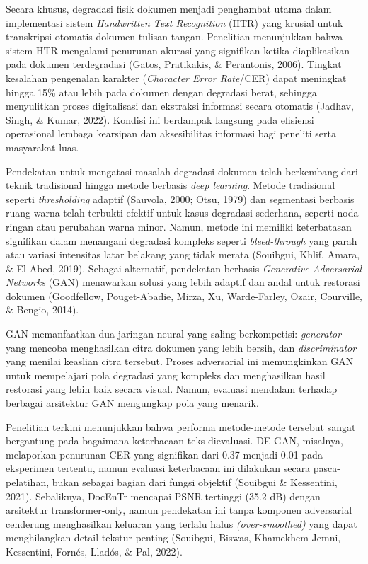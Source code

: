 \documentclass[12pt,a4paper]{article}
\begin{document}
\vspace{0.8em}
Secara khusus, degradasi fisik dokumen menjadi penghambat utama dalam implementasi sistem \textit{Handwritten Text Recognition} (HTR) yang krusial untuk transkripsi otomatis dokumen tulisan tangan. Penelitian menunjukkan bahwa sistem HTR mengalami penurunan akurasi yang signifikan ketika diaplikasikan pada dokumen terdegradasi (Gatos, Pratikakis, \& Perantonis, 2006). Tingkat kesalahan pengenalan karakter (\textit{Character Error Rate}/CER) dapat meningkat hingga 15\% atau lebih pada dokumen dengan degradasi berat, sehingga menyulitkan proses digitalisasi dan ekstraksi informasi secara otomatis (Jadhav, Singh, \& Kumar, 2022). Kondisi ini berdampak langsung pada efisiensi operasional lembaga kearsipan dan aksesibilitas informasi bagi peneliti serta masyarakat luas.

\vspace{0.8em}
Pendekatan untuk mengatasi masalah degradasi dokumen telah berkembang dari teknik tradisional hingga metode berbasis \textit{deep learning}. Metode tradisional seperti \textit{thresholding} adaptif (Sauvola, 2000; Otsu, 1979) dan segmentasi berbasis ruang warna telah terbukti efektif untuk kasus degradasi sederhana, seperti noda ringan atau perubahan warna minor. Namun, metode ini memiliki keterbatasan signifikan dalam menangani degradasi kompleks seperti \textit{bleed-through} yang parah atau variasi intensitas latar belakang yang tidak merata (Souibgui, Khlif, Amara, \& El Abed, 2019). Sebagai alternatif, pendekatan berbasis \textit{Generative Adversarial Networks} (GAN) menawarkan solusi yang lebih adaptif dan andal untuk restorasi dokumen (Goodfellow, Pouget-Abadie, Mirza, Xu, Warde-Farley, Ozair, Courville, \& Bengio, 2014).

\vspace{0.8em}
GAN memanfaatkan dua jaringan neural yang saling berkompetisi: \textit{generator} yang mencoba menghasilkan citra dokumen yang lebih bersih, dan \textit{discriminator} yang menilai keaslian citra tersebut. Proses adversarial ini memungkinkan GAN untuk mempelajari pola degradasi yang kompleks dan menghasilkan hasil restorasi yang lebih baik secara visual. Namun, evaluasi mendalam terhadap berbagai arsitektur GAN mengungkap pola yang menarik.

\vspace{0.8em}
Penelitian terkini menunjukkan bahwa performa metode-metode tersebut sangat bergantung pada bagaimana keterbacaan teks dievaluasi. DE-GAN, misalnya, melaporkan penurunan CER yang signifikan dari 0.37 menjadi 0.01 pada eksperimen tertentu, namun evaluasi keterbacaan ini dilakukan secara pasca-pelatihan, bukan sebagai bagian dari fungsi objektif (Souibgui \& Kessentini, 2021). Sebaliknya, DocEnTr mencapai PSNR tertinggi (35.2 dB) dengan arsitektur transformer-only, namun pendekatan ini tanpa komponen adversarial cenderung menghasilkan keluaran yang terlalu halus \textit{(over-smoothed)} yang dapat menghilangkan detail tekstur penting (Souibgui, Biswas, Khamekhem Jemni, Kessentini, Fornés, Lladós, \& Pal, 2022).
\end{document}
